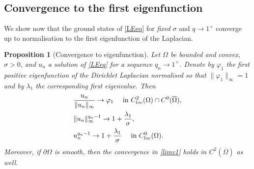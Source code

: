 \documentclass[12pt]{amsart}
\numberwithin{equation}{section}
\theoremstyle{plain}
\theoremstyle{plain}
\newtheorem{proposition}[theorem]{Proposition}
\theoremstyle{plain}
\theoremstyle{definition}
\begin{document}
 
 \subsection{Convergence to the first eigenfunction}
 \label{sec_conv_eig}
 
We show now that the ground states of \eqref{LEeq} for {\em fixed} $\sigma$ and $q \to 1^+$ 
converge up to normalisation to the first eigenfunction of the Laplacian. 

\begin{proposition}[Convergence to eigenfunction]
\label{prop_conv_eigenf}
Let $\Omega$ be bounded and convex, $\sigma>0$, and $u_n$ a solution of \eqref{LEeq} for a sequence $q_n\to 1^+$. 
Denote by $\varphi_1$ the first positive eigenfunction of the Dirichlet Laplacian normalised so that $\|\varphi_1\|_\infty=1$ and by $\lambda_1$ the corresponding first eigenvalue. 
Then 
\begin{align}
&\label{limv1}
\frac{u_{n}}{\|u_n\|_\infty} \to \varphi_1\quad \text{ in $C^2_{\rm loc}(\Omega)\cap C^0(\overline{\Omega})$},
\\&\label{limMq}
 \|u_n\|_\infty^{q_n-1} \to 1+\frac{\lambda_1}{\sigma},
\\& \label{limuq-1}
u_n^{q_n-1}\to 1+\frac{\lambda_1}{\sigma}\quad \text{ in $C^0_{{\rm loc}}
(\Omega)$}.
\end{align}
Moreover, if $\partial\Omega$ is smooth, then the convergence in \eqref{limv1} holds in $C^{2}(\overline{\Omega})$ as well.
\end{proposition}
\end{document}
